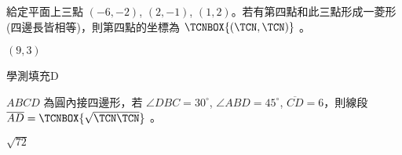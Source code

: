 \begin{QUESTIONS}
\begin{QUESTION}
        \begin{ExamAnsRateInfo}{49}{88}{50}{9}
        \end{ExamAnsRateInfo}
        \begin{QBODY}
            給定平面上三點 $(-6, -2)$, $(2, -1)$, $(1, 2)$。若有第四點和此三點形成一菱形(四邊長皆相等)，則第四點的坐標為 $\TCNBOX{(\TCN,\TCN)}$ 。
        \end{QBODY}
        \begin{QFROMS}
        \end{QFROMS}
        \begin{QTAGS}\end{QTAGS}
        \begin{QANS}
            $(9,3)$
        \end{QANS}
        \begin{QSOLLIST}
        \end{QSOLLIST}
        \begin{QEMPTYSPACE}
        \end{QEMPTYSPACE}
    \end{QUESTION}
    \begin{QUESTION}
        \begin{ExamInfo}{95}{學測}{填充}{D}
        \end{ExamInfo}
        \begin{ExamAnsRateInfo}{34}{72}{26}{4}
        \end{ExamAnsRateInfo}
        \begin{QBODY}
            $ABCD$ 為圓內接四邊形，若 $\angle DBC = 30 ^\circ$, $\angle ABD = 45^\circ$, $\overline{CD}=6$，則線段 $\overline{AD}= \TCNBOX{\sqrt{\TCN\TCN}}$ 。
        \end{QBODY}
        \begin{QFROMS}
        \end{QFROMS}
        \begin{QTAGS}\end{QTAGS}
        \begin{QANS}
            $\sqrt{72}$
        \end{QANS}
        \begin{QSOLLIST}
        \end{QSOLLIST}
        \begin{QEMPTYSPACE}
        \end{QEMPTYSPACE}
    \end{QUESTION}

\end{QUESTIONS}
